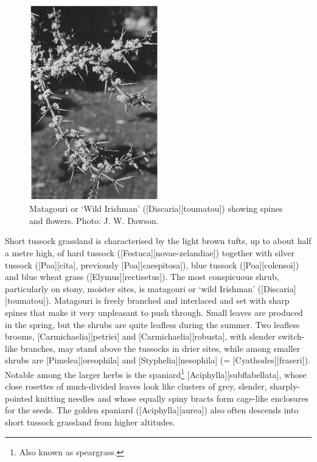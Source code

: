 \begin{figure}
	\includegraphics[width=0.5\textwidth]{graphics/figure83matagouri.jpg}
	\centering
	\caption[Matagouri]{Matagouri or `Wild Irishman' ([Discaria][toumatou]) showing spines and flowers.
	Photo:  J. W. Dawson.}%
	\label{fig:83matagouri}
\end{figure}

Short tussock grassland is characterised by the light brown tufts, up to about half a metre high, of hard tussock ([Festuca][novae-zelandiae]) together with silver tussock ([Poa][cita], previously [Poa][caespitosa]), blue tussock ([Poa][colensoi]) and blue wheat grass ([Elymus][rectisetus]).
The most conspicuous shrub, particularly on stony, moister sites, is matagouri or `wild Irishman' ([Discaria][toumatou]).
Matagouri is freely branched and interlaced and set with sharp spines that make it very unpleasant to push through.
Small leaves are produced in the spring, but the shrubs are quite leafless during the summer.
Two leafless brooms, [Carmichaelia][petriei] and [Carmichaelia][robusta], with slender switch-like branches, may stand above the tussocks in drier sites, while among smaller shrubs are [Pimelea][oreophila] and [Styphelia][nesophila] (= [Cyathodes][fraseri]).
Notable among the larger herbs is the spaniard\footnote{Also known as speargrass.} [Aciphylla][subflabellata], whose close rosettes of much-divided leaves look like clusters of grey, slender, sharply-pointed knitting needles and whose equally spiny bracts form cage-like enclosures for the seeds.
The golden spaniard ([Aciphylla][aurea]) also often descends into short tussock grassland from higher altitudes.

